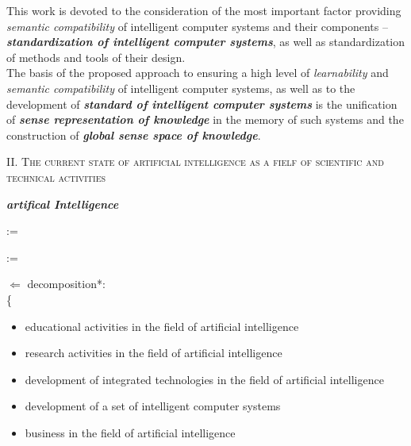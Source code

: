 \documentclass[10pt, a4paper]{proc}
\begin{document}
 \indent This work is devoted to the consideration of the most important factor providing \textit{semantic compatibility} of intelligent computer systems and their components – \textbf{\textit{standardization of intelligent computer systems}}, as well as standardization of methods and tools of their design.\\
 \indent The basis of the proposed approach to ensuring a high level of \textit{learnability} and \textit{semantic compatibility} of intelligent computer systems, as well as to the development of \textit{\textbf{standard of intelligent computer systems}} is the unification of \textit{\textbf{sense representation of knowledge}} in the memory of such systems and the construction of \textit{\textbf{global sense space of knowledge}}.\\
 \begin{Center}
 \large \textsc{II. The current state of artificial intelligence as a fielf of scientific and technical activities}\\
 \end{Center}
 \normalsize
 \textbf{\textit{artifical Intelligence}}
 \vspace{-0.3   cm}
 \setlength{\columnsep}{-6cm}
 \begin{multicols}{2}
 :=

 \columnbreak
 \end{multicols}
 \begin{multicols}{2}
 :=

 \columnbreak
 \end{multicols}
 \(\Leftarrow\) decomposition*:\\
 \{
 \begin{itemize}
  \item educational activities in the field of artificial intelligence
  \item research activities in the field of artificial intelligence
  \item development of integrated technologies in the field of artificial intelligence
  \item development of a set of intelligent computer systems
  \item business in the field of artificial intelligence
 \end{itemize}
\end{document}
